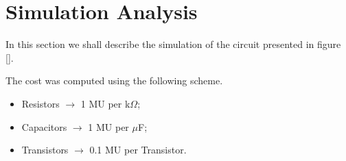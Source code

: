 \clearpage

\section{Simulation Analysis}
\label{sec:simulation}

In this section we shall describe the simulation of the circuit presented in figure \ref{}.

%      
%      


The cost was computed using the following scheme.

\begin{itemize}
  \item Resistors $\rightarrow$ 1 MU per k$\Omega$;
  \item Capacitors $\rightarrow$ 1 MU per $\mu$F;
  \item Transistors $\rightarrow$ 0.1 MU per Transistor.
\end{itemize}